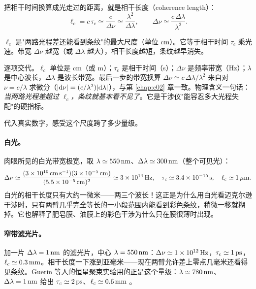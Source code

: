 把相干时间换算成光走过的距离，就是相干长度（coherence length）：
\begin{equation}
  \ell_c=c\,\tau_c\simeq\frac{c}{\Delta\nu}\simeq\frac{\lambda^2}{\Delta\lambda},
  \qquad
  \Delta\nu\simeq\frac{c\,\Delta\lambda}{\lambda^2}.
  \label{eq:e09-coherence-length}
\end{equation}
\begin{formulaexplain}
\(\ell_c\) 是"两路光程差还能看到条纹"的最大尺度（单位 cm）。它等于相干时间 \(\tau_c\) 乘光速。带宽 \(\Delta\nu\) 越宽（或 \(\Delta\lambda\) 越大），相干长度越短，条纹越早消失。
\end{formulaexplain}
逐项交代。\(\ell_c\) 单位是 cm（或 m）；\(\tau_c\) 是相干时间（s）；\(\Delta\nu\) 是频率带宽（Hz）；\(\lambda\) 是中心波长，\(\Delta\lambda\) 是波长带宽。最后一步的带宽换算 \(\Delta\nu\simeq c\,\Delta\lambda/\lambda^2\) 来自对 \(\nu=c/\lambda\) 求微分（\(|{\rm d}\nu|=(c/\lambda^2)|{\rm d}\lambda|\)），与第 \ref{chap:e02} 章一致。物理含义一句话：\emph{当两路光程差超过 \(\ell_c\)，条纹就基本看不见了}。它是干涉仪"能容忍多大光程失配"的硬指标。

代入真实数字，感受这个尺度跨了多少量级。

\paragraph{白光。}肉眼所见的白光带宽极宽，取 \(\lambda\simeq550\,{\rm nm}\)、\(\Delta\lambda\simeq300\,{\rm nm}\)（整个可见光）：
\[
  \Delta\nu\simeq\frac{(3\times10^{10}\,{\rm cm\,s^{-1}})(3\times10^{-5}\,{\rm cm})}
  {(5.5\times10^{-5}\,{\rm cm})^2}\simeq3\times10^{14}\,{\rm Hz},
  \quad
  \tau_c\simeq3.4\times10^{-15}\,{\rm s},
  \quad
  \ell_c\simeq1\,\mu{\rm m}.
\]
白光的相干长度只有大约一微米——两三个波长！这正是为什么用白光看迈克尔逊干涉时，只有两臂几乎完全等长的一小段范围内能看到彩色条纹，稍微一移就糊掉。它也解释了肥皂膜、油膜上的彩色干涉为什么只在膜很薄时出现。

\paragraph{窄带滤光片。}加一片 \(\Delta\lambda=1\,{\rm nm}\) 的滤光片，中心 \(\lambda=550\,{\rm nm}\)：\(\Delta\nu\simeq1\times10^{12}\,{\rm Hz}\)，\(\tau_c\simeq1\,{\rm ps}\)，\(\ell_c\simeq0.3\,{\rm mm}\)。相干长度一下涨到亚毫米——现在两臂允许差上零点几毫米还看得见条纹。Guerin 等人的恒星聚束实验用的正是这个量级：\(\lambda\simeq780\,{\rm nm}\)、\(\Delta\lambda=1\,{\rm nm}\) 给出 \(\tau_c\simeq2\,{\rm ps}\)、\(\ell_c\simeq0.6\,{\rm mm}\) \citep{2017MNRAS.472.4126G}。

